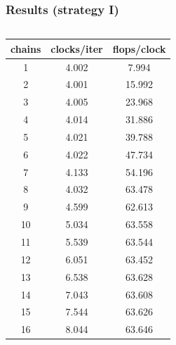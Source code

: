 \documentclass[12pt,dvipdfmx]{beamer}
\begin{document}
\begin{frame}
\frametitle{Results (strategy I)}

\begin{columns}[t]
\begin{column}{0.35\textwidth}
  \begin{center}
    \vskip0.5cm
{\scriptsize
\begin{tabular}{|c|c|c|}\hline
chains & clocks/iter & flops/clock \\
\hline
1 & 4.002 & 7.994 \\
2 & 4.001 & 15.992 \\
3 & 4.005 & 23.968 \\
4 & 4.014 & 31.886 \\
5 & 4.021 & 39.788 \\
6 & 4.022 & 47.734 \\
7 & 4.133 & 54.196 \\
8 & 4.032 & 63.478 \\
9 & 4.599 & 62.613 \\
10 & 5.034 & 63.558 \\
11 & 5.539 & 63.544 \\
12 & 6.051 & 63.452 \\
13 & 6.538 & 63.628 \\
14 & 7.043 & 63.608 \\
15 & 7.544 & 63.626 \\
16 & 8.044 & 63.646 \\
\hline
\end{tabular}}
\end{center}
\end{column}

\begin{column}{0.65\textwidth}
\begin{center}
  {\tiny }
\end{center}
\end{column}
\end{columns}

\end{frame}
\end{document}
